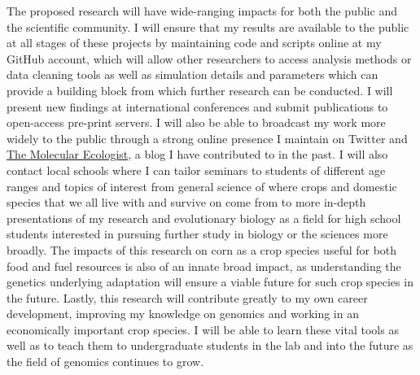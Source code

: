 The proposed research will have wide-ranging impacts for both the public and the scientific community. I will ensure that my results are available to the public at all stages of these projects by maintaining code and scripts online at my GitHub account, which will allow other researchers to access analysis methods or data cleaning tools as well as simulation details and parameters which can provide a building block from which further research can be conducted. I will present new findings at international conferences and submit publications to open-access pre-print servers. I will also be able to broadcast my work more widely to the public through a strong online presence I maintain on Twitter and \href{http://www.molecularecologist.com/}{The Molecular Ecologist}, a blog I have contributed to in the past. I will also contact local schools where I can tailor seminars to students of different age ranges and topics of interest from general science of where crops and domestic species that we all live with and survive on come from to more in-depth presentations of my research and evolutionary biology as a field for high school students interested in pursuing further study in biology or the sciences more broadly. The impacts of this research on corn as a crop species useful for both food and fuel resources is also of an innate broad impact, as understanding the genetics underlying adaptation will ensure a viable future for such crop species in the future. Lastly, this research will contribute greatly to my own career development, improving my knowledge on genomics and working in an economically important crop species. I will be able to learn these vital tools as well as to teach them to undergraduate students in the lab and into the future as the field of genomics continues to grow.








